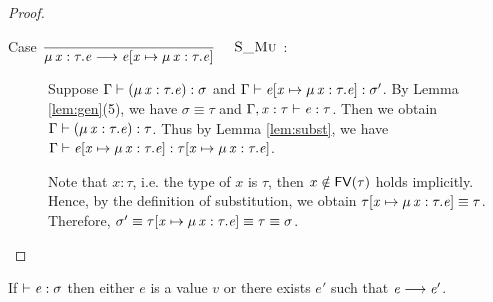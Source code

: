 \begin{proof}
\begin{description}
        \item[Case ${\displaystyle\frac{\begin{array}{l} \end{array}}{ \mu \, \mathit{x} : \tau . \mathit{e} \longrightarrow \mathit{e} [ \mathit{x} \mapsto \mu \, \mathit{x} : \tau . \mathit{e} ]}\quad\textsc{ {\textsc{S\_Mu}}{} }}$:] $\quad$ \\
        Suppose $\Gamma  \vdash  (  \mu \, \mathit{x}  :  \tau  .  \mathit{e}  )  :  \sigma$ and $\Gamma  \vdash  \mathit{e}  [  \mathit{x}  \mapsto  \mu \, \mathit{x}  :  \tau  .  \mathit{e}  ]  :  \sigma'$. By Lemma \ref{lem:gen}(5), we have $\sigma  \equiv  \tau$ and $\Gamma  ,  \mathit{x}  :  \tau  \vdash  \mathit{e}  :  \tau$. Then we obtain $\Gamma  \vdash  (  \mu \, \mathit{x}  :  \tau  .  \mathit{e}  )  :  \tau$. Thus by Lemma \ref{lem:subst}, we have $\Gamma  \vdash  \mathit{e}  [  \mathit{x}  \mapsto  \mu \, \mathit{x}  :  \tau  .  \mathit{e}  ]  :  \tau  [  \mathit{x}  \mapsto  \mu \, \mathit{x}  :  \tau  .  \mathit{e}  ]$.
        
        Note that $x:\tau$, i.e. the type of $x$ is $\tau$, then $x \notin \mathsf{FV}(\tau)$ holds implicitly. Hence, by the definition of substitution, we obtain $\tau  [  \mathit{x}  \mapsto  \mu \, \mathit{x}  :  \tau  .  \mathit{e}  ]  \equiv  \tau$. Therefore, $\sigma'  \equiv  \tau  [  \mathit{x}  \mapsto  \mu \, \mathit{x}  :  \tau  .  \mathit{e}  ]  \equiv  \tau  \equiv  \sigma$.
    \end{description}
\end{proof}

\begin{lem}[Progress]
If $\vdash  \mathit{e}  :  \sigma$ then either $e$ is a value $v$ or there exists $e'$ such that $\mathit{e}  \longrightarrow  \mathit{e'}$.
\end{lem}

